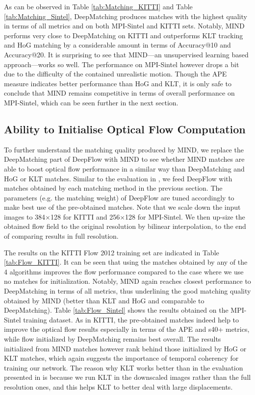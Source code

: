 \documentclass[runningheads]{llncs}
\begin{document}
	As can be observed in Table \ref{tab:Matching_KITTI} and Table \ref{tab:Matching_Sintel}, DeepMatching produces matches with the highest quality in terms of all metrics and on both MPI-Sintel and KITTI sets. Notably, MIND performs very close to DeepMatching on KITTI and outperforms KLT tracking and HoG matching by a considerable amount in terms of Accuracy@10 and Accuracy@20. It is surprising to see that MIND---an unsupervised learning based approach---works so well. The performance on MPI-Sintel however drops a bit due to the difficulty of the contained unrealistic motion. Though the APE measure indicates better performance than HoG and KLT, it is only safe to conclude that MIND remains competitive in terms of overall performance on MPI-Sintel, which can be seen further in the next section.
			    		    
	\vspace{-0.4cm}
	\subsection{Ability to Initialise Optical Flow Computation}
	
	\vspace{-0.3cm}

	To further understand the matching quality produced by MIND, we replace the DeepMatching part of DeepFlow\cite{weinzaepfel2013deepflow} with MIND to see whether MIND matches are able to boost optical flow performance in a similar way than DeepMatching and HoG or KLT matches. Similar to the evaluation in \cite{weinzaepfel2013deepflow}, we feed DeepFlow with matches obtained by each matching method in the previous section. The parameters (e.g. the matching weight) of DeepFlow are tuned accordingly to make best use of the pre-obtained matches. Note that we scale down the input images to 384$\times$128 for KITTI and 256$\times$128 for MPI-Sintel. We then up-size the obtained flow field to the original resolution by bilinear interpolation, to the end of comparing results in full resolution.
	
	The results on the KITTI Flow 2012 training set are indicated in Table \ref{tab:Flow_KITTI}. It can be seen that using the matches obtained by any of the 4 algorithms improves the flow performance compared to the case where we use no matches for initialization. Notably, MIND again reaches closest performance to DeepMatching in terms of all metrics, thus underlining the good matching quality obtained by MIND (better than KLT and HoG and comparable to DeepMatching). Table \ref{tab:Flow_Sintel} shows the results obtained on the MPI-Sintel training dataset. As in KITTI, the pre-obtained matches indeed help to improve the optical flow results especially in terms of the APE and s40+ metrics, while flow initialized by DeepMatching remains best overall. The results initialized from MIND matches however rank behind those initialized by HoG or KLT matches, which again suggests the importance of temporal coherency for training our network. The reason why KLT works better than in the evaluation presented in \cite{weinzaepfel2013deepflow} is because we run KLT in the downscaled images rather than the full resolution ones, and this helps KLT to better deal with large displacements.
	
\end{document}

